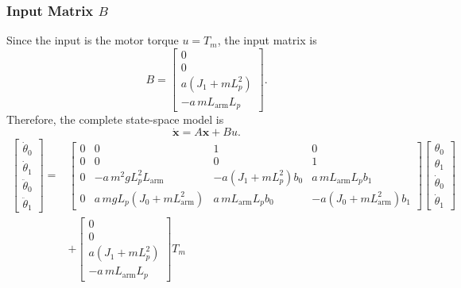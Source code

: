 \documentclass[a4paper,11pt]{article}
\newcommand{\La}{L_{\mathrm{arm}}}
\begin{document}
\subsubsection{Input Matrix \texorpdfstring{$B$}{B}}
Since the input is the motor torque $u = T_m$, the input matrix is
\begin{equation}
\boxed{
B = \begin{bmatrix} 0 \\ 0 \\ a\left(J_1 + m L_p^2\right) \\ -a\, m \La L_p \end{bmatrix}.
}
\end{equation}
Therefore, the complete state-space model is
\begin{equation}
\boxed{\dot{\mathbf{x}} = A\mathbf{x} + Bu .}
\end{equation}
\begin{equation}
\begin{aligned}
\begin{bmatrix} \dot\theta_0 \\ \dot\theta_1 \\ \ddot\theta_0 \\ \ddot\theta_1 \end{bmatrix}
= {}&
\begin{bmatrix}
0 & 0 & 1 & 0\\
0 & 0 & 0 & 1\\
0 & -a\, m^2 g L_p^2 \La & -a\left(J_1 + m L_p^2\right) b_0 & a\, m \La L_p b_1\\
0 & a\, m g L_p \left(J_0 + m \La^2\right) & a\, m \La L_p b_0 & -a\left(J_0 + m \La^2\right) b_1
\end{bmatrix}
\begin{bmatrix} \theta_0 \\ \theta_1 \\ \dot\theta_0 \\ \dot\theta_1 \end{bmatrix}\\
& + \begin{bmatrix} 0 \\ 0 \\ a\left(J_1 + m L_p^2\right) \\ -a\, m \La L_p \end{bmatrix} T_m
\end{aligned}
\label{eq:ss4T}
\end{equation}
\end{document}
